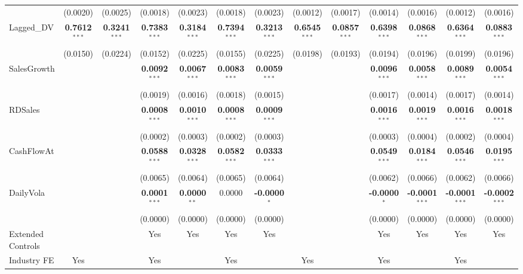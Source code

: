 \begin{landscape}
\begin{table}[H]
\begin{tabular}{lcccccccccccc}
 & (0.0020) & (0.0025) & (0.0018) & (0.0023) & (0.0018) & (0.0023) & (0.0012) & (0.0017) & (0.0014) & (0.0016) & (0.0012) & (0.0016) \\
Lagged\_DV & \textbf{0.7612}$^{***}$ & \textbf{0.3241}$^{***}$ & \textbf{0.7383}$^{***}$ & \textbf{0.3184}$^{***}$ & \textbf{0.7394}$^{***}$ & \textbf{0.3213}$^{***}$ & \textbf{0.6545}$^{***}$ & \textbf{0.0857}$^{***}$ & \textbf{0.6398}$^{***}$ & \textbf{0.0868}$^{***}$ & \textbf{0.6364}$^{***}$ & \textbf{0.0883}$^{***}$ \\
 & (0.0150) & (0.0224) & (0.0152) & (0.0225) & (0.0155) & (0.0225) & (0.0198) & (0.0193) & (0.0194) & (0.0196) & (0.0199) & (0.0196) \\
SalesGrowth &  &  & \textbf{0.0092}$^{***}$ & \textbf{0.0067}$^{***}$ & \textbf{0.0083}$^{***}$ & \textbf{0.0059}$^{***}$ &  &  & \textbf{0.0096}$^{***}$ & \textbf{0.0058}$^{***}$ & \textbf{0.0089}$^{***}$ & \textbf{0.0054}$^{***}$ \\
 &  &  & (0.0019) & (0.0016) & (0.0018) & (0.0015) &  &  & (0.0017) & (0.0014) & (0.0017) & (0.0014) \\
RDSales &  &  & \textbf{0.0008}$^{***}$ & \textbf{0.0010}$^{***}$ & \textbf{0.0008}$^{***}$ & \textbf{0.0009}$^{***}$ &  &  & \textbf{0.0016}$^{***}$ & \textbf{0.0019}$^{***}$ & \textbf{0.0016}$^{***}$ & \textbf{0.0018}$^{***}$ \\
 &  &  & (0.0002) & (0.0003) & (0.0002) & (0.0003) &  &  & (0.0003) & (0.0004) & (0.0002) & (0.0004) \\
CashFlowAt &  &  & \textbf{0.0588}$^{***}$ & \textbf{0.0328}$^{***}$ & \textbf{0.0582}$^{***}$ & \textbf{0.0333}$^{***}$ &  &  & \textbf{0.0549}$^{***}$ & \textbf{0.0184}$^{***}$ & \textbf{0.0546}$^{***}$ & \textbf{0.0195}$^{***}$ \\
 &  &  & (0.0065) & (0.0064) & (0.0065) & (0.0064) &  &  & (0.0062) & (0.0066) & (0.0062) & (0.0066) \\
DailyVola &  &  & \textbf{0.0001}$^{***}$ & \textbf{0.0000}$^{**}$ & 0.0000 & \textbf{-0.0000}$^{*}$ &  &  & \textbf{-0.0000}$^{*}$ & \textbf{-0.0001}$^{***}$ & \textbf{-0.0001}$^{***}$ & \textbf{-0.0002}$^{***}$ \\
 &  &  & (0.0000) & (0.0000) & (0.0000) & (0.0000) &  &  & (0.0000) & (0.0000) & (0.0000) & (0.0000) \\
\midrule
Extended Controls &  &  & Yes & Yes & Yes & Yes &  &  & Yes & Yes & Yes & Yes \\
Industry FE & Yes &  & Yes &  & Yes &  & Yes &  & Yes &  & Yes &  \\

\end{tabular}
\end{table}
\end{landscape}
